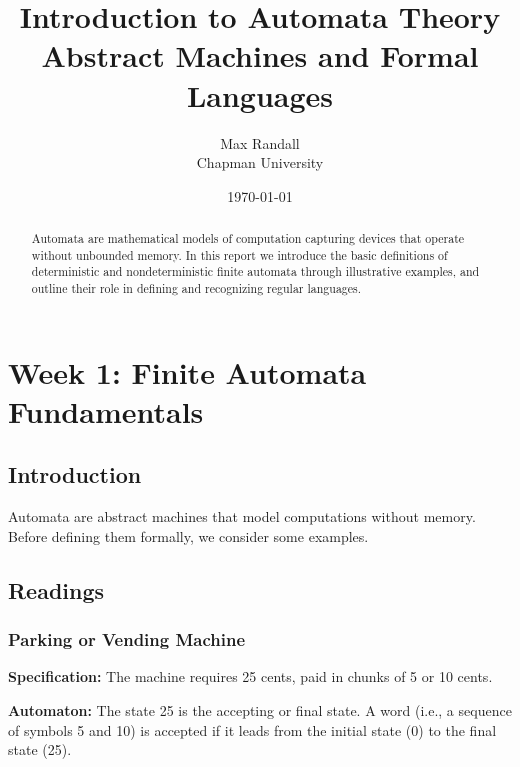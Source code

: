 \documentclass{article}
\title{Introduction to Automata Theory\\%
       \large Abstract Machines and Formal Languages}
\author{Max Randall \\ Chapman University}
\date{\today}
\theoremstyle{theorem}
\theoremstyle{definition}
\theoremstyle{remark}
\begin{document}
\maketitle

\begin{abstract}
Automata are mathematical models of computation capturing devices
that operate without unbounded memory.  In this report we introduce
the basic definitions of deterministic and nondeterministic finite
automata through illustrative examples, and outline their role in
defining and recognizing regular languages.
\end{abstract}


\tableofcontents

\newpage

\section{Week 1: Finite Automata Fundamentals}

\subsection{Introduction}
Automata are abstract machines that model computations without memory. Before defining them formally, we consider some examples.

\subsection{Readings}

\subsubsection*{Parking or Vending Machine}
\textbf{Specification:} The machine requires 25 cents, paid in chunks of 5 or 10 cents.

\textbf{Automaton:} The state 25 is the accepting or final state. A word (i.e., a sequence of symbols 5 and 10) is accepted if it leads from the initial state (0) to the final state (25).

\begin{center}
\end{center}
\end{document}
